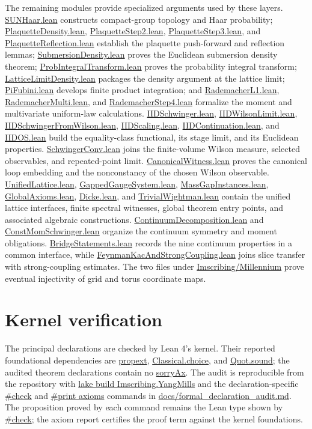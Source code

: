 \documentclass[11pt]{article}
\numberwithin{equation}{section}
\newcommand{\Lean}[1]{\url{#1}}
\begin{document}
The remaining modules provide specialized arguments used by these layers. \Lean{SUNHaar.lean} constructs compact-group topology and Haar probability; \Lean{PlaquetteDensity.lean}, \Lean{PlaquetteStep2.lean}, \Lean{PlaquetteStep3.lean}, and \Lean{PlaquetteReflection.lean} establish the plaquette push-forward and reflection lemmas; \Lean{SubmersionDensity.lean} proves the Euclidean submersion density theorem; \Lean{ProbIntegralTransform.lean} proves the probability integral transform; \Lean{LatticeLimitDensity.lean} packages the density argument at the lattice limit; \Lean{PiFubini.lean} develops finite product integration; and \Lean{RademacherL1.lean}, \Lean{RademacherMulti.lean}, and \Lean{RademacherStep4.lean} formalize the moment and multivariate uniform-law calculations. \Lean{IIDSchwinger.lean}, \Lean{IIDWilsonLimit.lean}, \Lean{IIDSchwingerFromWilson.lean}, \Lean{IIDScaling.lean}, \Lean{IIDContinuation.lean}, and \Lean{IIDOS.lean} build the equality-class functional, its stage limit, and its Euclidean properties. \Lean{SchwingerConv.lean} joins the finite-volume Wilson measure, selected observables, and repeated-point limit. \Lean{CanonicalWitness.lean} proves the canonical loop embedding and the nonconstancy of the chosen Wilson observable. \Lean{UnifiedLattice.lean}, \Lean{GappedGaugeSystem.lean}, \Lean{MassGapInstances.lean}, \Lean{GlobalAxioms.lean}, \Lean{Dicke.lean}, and \Lean{TrivialWightman.lean} contain the unified lattice interfaces, finite spectral witnesses, global theorem entry points, and associated algebraic constructions. \Lean{ContinuumDecomposition.lean} and \Lean{ConstMomSchwinger.lean} organize the continuum symmetry and moment obligations. \Lean{BridgeStatements.lean} records the nine continuum properties in a common interface, while \Lean{FeynmanKacAndStrongCoupling.lean} joins slice transfer with strong-coupling estimates. The two files under \Lean{Imscribing/Millennium} prove eventual injectivity of grid and torus coordinate maps.

\section{Kernel verification}

The principal declarations are checked by Lean 4's kernel. Their reported foundational dependencies are \Lean{propext}, \Lean{Classical.choice}, and \Lean{Quot.sound}; the audited theorem declarations contain no \Lean{sorryAx}. The audit is reproducible from the repository with \Lean{lake build Imscribing.YangMills} and the declaration-specific \Lean{\#check} and \Lean{\#print axioms} commands in \Lean{docs/formal\_declaration\_audit.md}. The proposition proved by each command remains the Lean type shown by \Lean{\#check}; the axiom report certifies the proof term against the kernel foundations.
\end{document}
